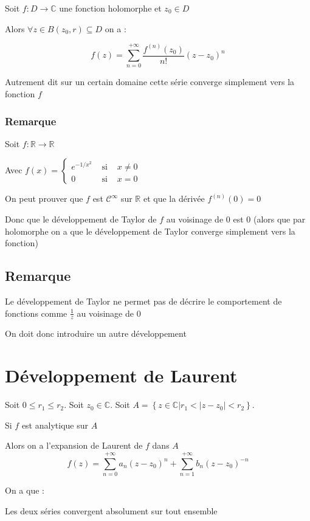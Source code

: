 \documentclass[a4paper,10pt]{report}
\newcommand{\ap}{\rightarrow}
\newcommand{\R}{\mathbb{R}}
\newcommand{\C}{\mathbb{C}}
\newcommand{\tset}[1]{\left\lbrace #1 \right\rbrace}
\newcommand{\abs}[1]{\left\vert #1 \right\vert}
\begin{document}
Soit $f: D \ap \C$ une fonction holomorphe et $z_0 \in D$

Alors $\forall z \in B(z_0,r) \subseteq D$ on a :

\[ f(z) = \sum_{n=0}^{+\infty} \frac{f^{(n)}(z_0)}{n!} (z-z_0)^n \]

Autrement dit sur un certain domaine cette série converge simplement vers la fonction $f$

\subsubsection{Remarque}

Soit $f : \R \ap \R$

Avec $f(x) = \left\{\begin{array}{ccc}
e^{-1/x^2} & \mbox{ si } & x \neq 0 \\
0 & \mbox{ si } & x = 0
\end{array}\right.$

On peut prouver que $f$ est $\mathcal{C}^\infty$ sur $\R$ et que la dérivée $f^{(n)}(0) = 0$

Donc que le développement de Taylor de $f$ au voisinage de $0$ est $0$ (alors que par holomorphe on a que le développement de Taylor converge simplement vers la fonction)

\subsection{Remarque}

Le développement de Taylor ne permet pas de décrire le comportement de fonctions comme $\frac{1}{z}$ au voisinage de $0$

On doit donc introduire un autre développement

\section{Développement de Laurent}

Soit $0 \leq r_1 \leq r_2$. Soit $z_0 \in \C$. Soit $A = \tset{z \in \C
\vert r_1 < \abs{z - z_0} < r_2}$.

Si $f$ est analytique sur $A$

Alors on a l'expansion de Laurent de $f$ dans $A$
\[f(z) = \sum_{n=0}^{+\infty} a_n(z - z_0)^n + \sum_{n=1}^{+\infty} b_n(z
- z_0)^{-n}\]

On a que :

Les deux séries convergent absolument sur tout ensemble
\end{document}
